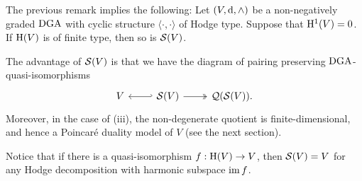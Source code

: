 \documentclass[\MainFolder/Text.tex]{subfiles}
\begin{document}
\begin{Remark}
\begin{RemarkList}
\item The previous remark implies the following: Let $(V,\mathrm{d},\wedge)$ be a non-negatively graded $\mathrm{DGA}$ with cyclic structure $\langle\cdot,\cdot\rangle$ of Hodge type. Suppose that $\mathrm{H}^1(V)=0$. If $\mathrm{H}(V)$ is of finite type, then so is $\mathcal{S}(V)$.
\item The advantage of $\mathcal{S}(V)$ is that we have the diagram of pairing preserving $\mathrm{DGA}$-quasi-isomorphisms
\[\begin{tikzcd}
 V & \VansSmall(V)\arrow[hook']{l} \arrow[two heads]{r} & \VansQuotient(\VansSmall(V)).
\end{tikzcd}\]
Moreover, in the case of (iii), the non-degenerate quotient is finite-dimensional, and hence a Poincar\'e duality model of $V$ (see the next section).
\item Notice that if there is a quasi-isomorphism $f:\mathrm{H}(V)\rightarrow V$, then $\mathcal{S}(V) = V$ for any Hodge decomposition with harmonic subspace $\operatorname{im} f$.  \qedhere
\end{RemarkList}
\end{Remark}
\end{document}
